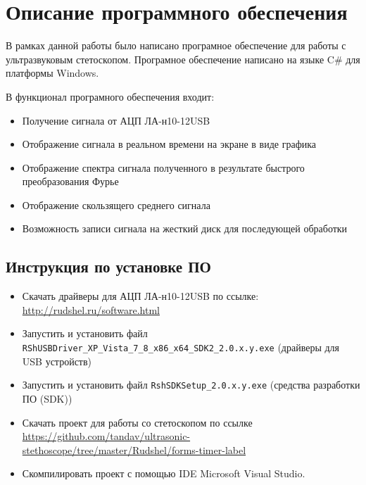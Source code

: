 \documentclass[14pt]{extarticle}
\begin{document}
\newpage
\section{Описание программного обеспечения}
В рамках данной работы было написано програмное обеспечение для работы с ультразвуковым стетоскопом. Програмное обеспечение написано на языке C\# для платформы Windows.

В функционал програмного обеспечения входит:
\begin{itemize}
  \item Получение сигнала от АЦП ЛА-н10-12USB
  \item Отображение сигнала в реальном времени на экране в виде графика
  \item Отображение спектра сигнала полученного в результате быстрого преобразования Фурье
  \item Отображение скользящего среднего сигнала
  \item Возможность записи сигнала на жесткий диск для последующей обработки
\end{itemize}

\subsection{Инструкция по установке ПО}
\begin{itemize}
  \item Скачать драйверы для АЦП ЛА-н10-12USB по ссылке:\\ \url{http://rudshel.ru/software.html}
  \item Запустить и установить файл \verb|RShUSBDriver_XP_Vista_7_8_x86_x64_SDK2_2.0.x.y.exe| (драйверы для USB устройств)
  \item Запустить и установить файл \verb|RshSDKSetup_2.0.x.y.exe| (средства разработки ПО (SDK))
  \item Скачать проект для работы со стетоскопом по ссылке \url{https://github.com/tandav/ultrasonic-stethoscope/tree/master/Rudshel/forms-timer-label}
  \item Скомпилировать проект с помощью IDE Microsoft Visual Studio.
\end{itemize}
\end{document}
